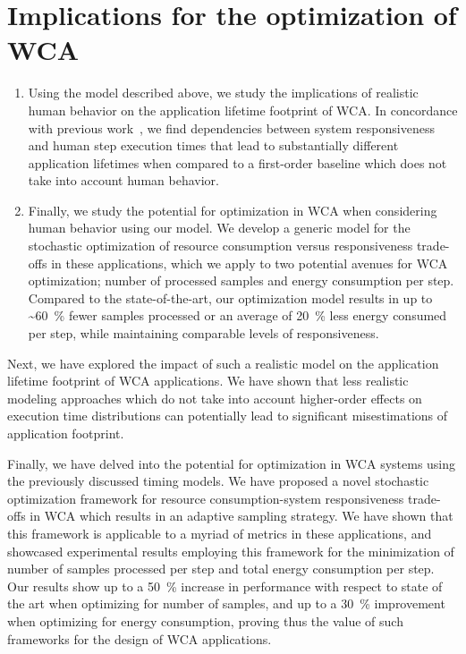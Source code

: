 \section{Implications for the optimization of \gls{WCA}}

\begin{enumerate}
    \item\label{item:contrib:footprint} Using the model described above, we study the implications of realistic human behavior on the application lifetime footprint of \gls{WCA}.
    In concordance with previous work~\cite{olguinmunoz:impact2021}, we find dependencies between system responsiveness and human step execution times that lead to substantially different application lifetimes when compared to a first-order baseline which does not take into account human behavior.
    \item\label{item:contrib:optimization} Finally, we study the potential for optimization in \gls{WCA} when considering human behavior using our model.
    We develop a generic model for the stochastic optimization of resource consumption versus responsiveness trade-offs in these applications, which we apply to two potential avenues for \gls{WCA} optimization; number of processed samples and energy consumption per step.
    Compared to the state-of-the-art, our optimization model results in up to \textasciitilde\SI{60}{\percent} fewer samples processed or an average of \SI{20}{\percent} less energy consumed per step, while maintaining comparable levels of responsiveness.
\end{enumerate}

Next, we have explored the impact of such a realistic model on the application lifetime footprint of \gls{WCA} applications.
We have shown that less realistic modeling approaches which do not take into account higher-order effects on execution time distributions can potentially lead to significant misestimations of application footprint.

Finally, we have delved into the potential for optimization in \gls{WCA} systems using the previously discussed timing models.
We have proposed a novel stochastic optimization framework for resource consumption-system responsiveness trade-offs in \gls{WCA} which results in an adaptive sampling strategy.
We have shown that this framework is applicable to a myriad of metrics in these applications, and showcased experimental results employing this framework for the minimization of number of samples processed per step and total energy consumption per step.
Our results show up to a \SI{50}{\percent} increase in performance with respect to state of the art when optimizing for number of samples, and up to a \SI{30}{\percent} improvement when optimizing for energy consumption, proving thus the value of such frameworks for the design of \gls{WCA} applications.